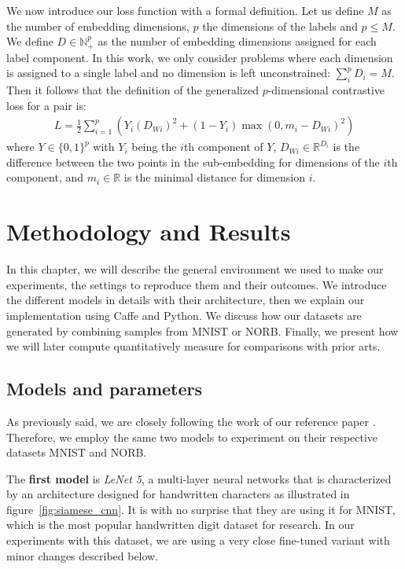 \documentclass[a4paper,12pt]{report}
\newcommand{\N}{\mathbb{N}}
\newcommand{\R}{\mathbb{R}}
\begin{document}
We now introduce our loss function with a formal definition.
Let us define $M$ as the number of embedding dimensions, $p$ the dimensions of the labels and $p \leq M$.
We define $D \in \N_+^p$ as the number of embedding dimensions assigned for each label component.
In this work, we only consider problems where each dimension is assigned to a single label and no dimension is left unconstrained: $\sum_i^p D_i = M$.
Then it follows that the definition of the generalized $p$-dimensional contrastive loss for a pair is:
\begin{eqnarray}
    L = \frac{1}{2} \sum_{i=1}^p \left( Y_i (D_{Wi})^2 + (1-Y_i) \max(0, m_i - D_{Wi})^2 \right)
\end{eqnarray}
where $Y \in \{0,1\}^p$ with $Y_i$ being the $i$th component of $Y$, $D_{Wi} \in \R^{D_i}$ is the difference between the two points in the sub-embedding for dimensions of the $i$th component, and $m_i \in \R$ is the minimal distance for dimension $i$.


\chapter{Methodology and Results}
\label{chap:results}

In this chapter, we will describe the general environment we used to make our experiments, the settings to reproduce them and their outcomes.
We introduce the different models in details with their architecture, then we explain our implementation using Caffe and Python.
We discuss how our datasets are generated by combining samples from MNIST or NORB.
Finally, we present how we will later compute quantitatively measure for comparisons with prior arts.

\section{Models and parameters}

As previously said, we are closely following the work of our reference paper \cite{hadsell2006dimensionality}.
Therefore, we employ the same two models to experiment on their respective datasets MNIST and NORB.

The {\bf first model} is {\em LeNet 5}, a multi-layer neural networks that is characterized by an architecture designed for handwritten characters as illustrated in figure~\ref{fig:siamese_cnn}.
It is with no surprise that they are using it for MNIST, which is the most popular handwritten digit dataset for research.
In our experiments with this dataset, we are using a very close fine-tuned variant with minor changes described below.
\end{document}
